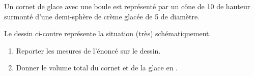 
\begin{exercice}\label{exosmath-0095}

    \begin{multicols}{2}
    Un cornet de glace avec une boule est représenté par un cône de \unit{10}{\centi\meter} de hauteur surmonté d'une demi-sphère de crème glacée de \unit{5}{\centi\meter} de diamètre.

    Le dessin ci-contre représente la situation (très) schématiquement.

    \begin{enumerate}
        \item
            Reporter les mesures de l'énoncé sur le dessin.
        \item
            Donner le volume total du cornet et de la glace en \centi\cubic\meter.
    \end{enumerate}

    \columnbreak

    \begin{center}

    \end{center}


    \end{multicols}

\end{exercice}
